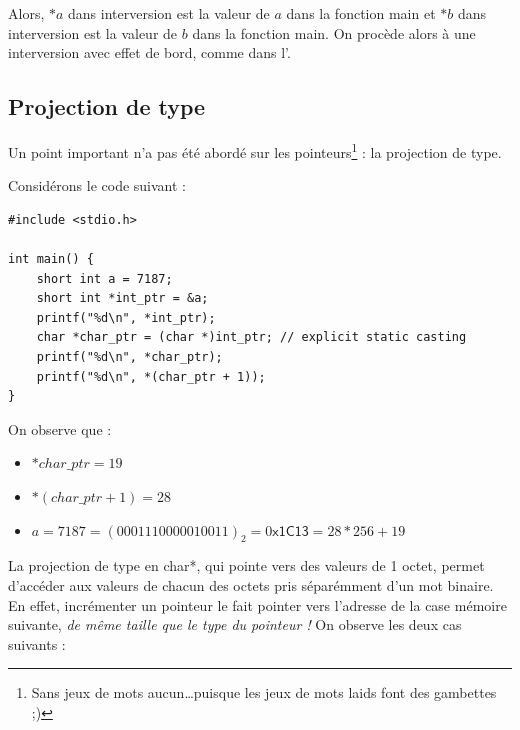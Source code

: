 \documentclass[../../../main.tex]{subfiles}
\begin{document}
Alors, $*a$ dans \textsf{interversion} est la valeur de $a$ dans la fonction \textsf{main} et $*b$ dans \textsf{interversion} est la valeur de $b$ dans la fonction \textsf{main}. On procède alors à une interversion avec effet de bord, comme dans l'.
 
\subsection{Projection de type}
Un point important n'a pas été abordé sur les pointeurs\footnote{Sans jeux de mots aucun\dots puisque les jeux de mots laids font des gambettes ;)} : la projection de type.
 
Considérons le code suivant :
\begin{verbatim}
#include <stdio.h>

int main() {
	short int a = 7187;
	short int *int_ptr = &a;
	printf("%d\n", *int_ptr);
	char *char_ptr = (char *)int_ptr; // explicit static casting
	printf("%d\n", *char_ptr);
	printf("%d\n", *(char_ptr + 1));
}
\end{verbatim}
On observe que :
\begin{itemize}
	\item $*char\_ptr = 19$
	\item $*(char\_ptr + 1) = 28$
	\item $a = 7187 = (0001110000010011)_{2} = 0\textsf{x1C13} = 28 * 256 + 19$
\end{itemize}
La projection de type en \textsf{char*}, qui pointe vers des valeurs de 1 octet, permet d'accéder aux valeurs de chacun des octets pris séparémment d'un mot binaire. En effet, incrémenter un pointeur le fait pointer vers l'adresse de la case mémoire suivante, \textit{de même taille que le type du pointeur !} On observe les deux cas suivants : 
\end{document}
